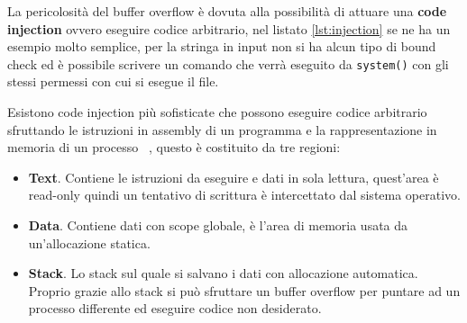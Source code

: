 \documentclass[Lau,binding=0.6cm]{sapthesis}
\newcommand{\textcode}[1]{\colorbox{backcolour}{\texttt{#1}}}
\begin{document}








La pericolosità del buffer overflow è dovuta alla possibilità di attuare una \textbf{code injection} ovvero eseguire codice arbitrario, nel listato \ref{lst:injection} se ne ha un esempio molto semplice, per la stringa in input non si ha alcun tipo di bound check ed è possibile scrivere un comando che verrà eseguito da \textcode{system()} con gli stessi permessi con cui si esegue il file. 




Esistono code injection più sofisticate che possono eseguire codice arbitrario sfruttando le istruzioni in assembly di un programma e la rappresentazione in memoria di un processo ~\cite{stack_smashing_ffp}, questo è costituito da tre regioni:

\begin{itemize}
    \item \textbf{Text}. Contiene le istruzioni da eseguire e dati in sola lettura, quest'area è read-only quindi un tentativo di scrittura è intercettato dal sistema operativo. 
    \item \textbf{Data}. Contiene dati con scope globale, è l'area di memoria usata da un'allocazione statica.
    \item \textbf{Stack}. Lo stack sul quale si salvano i dati con allocazione automatica.
    Proprio grazie allo stack si può sfruttare un buffer overflow per puntare ad un processo differente ed eseguire codice non desiderato.
\end{itemize}
\end{document}
